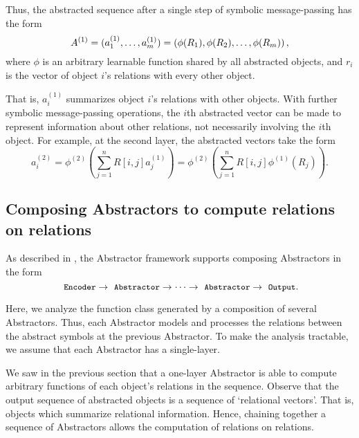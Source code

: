 Thus, the abstracted sequence after a single step of symbolic message-passing has the form
\begin{equation}
	\label{eq:abstracted_seq_1_layer_abstractor}
	A^{(1)} = (a_1^{(1)}, \ldots, a_m^{(1)}) = \left(\phi(R_1), \phi(R_2), \ldots, \phi(R_m)\right),
\end{equation}
where \(\phi\) is an arbitrary learnable function shared by all abstracted objects, and \(r_i\) is the vector of object \(i\)'s relations with every other object.

That is, \(a_i^{(1)}\) summarizes object \(i\)'s relations with other objects. With further symbolic message-passing operations, the \(i\)th abstracted vector can be made to represent information about other relations, not necessarily involving the \(i\)th object. For example, at the second layer, the abstracted vectors take the form
\begin{equation}
	a_i^{(2)} = \phi^{(2)} \left( \sum_{j=1}^{n} R[i,j] a_j^{(1)} \right) = \phi^{(2)} \left( \sum_{j=1}^{n} R[i,j] \phi^{(1)}(R_j) \right).
\end{equation}

\subsection{Composing  Abstractors to compute relations on relations}\label{ssec:compsing_abstractors}

As described in , the Abstractor framework supports composing  Abstractors in the form
\begin{equation*}
	\module{Encoder} \to \module{Abstractor} \to \cdots \to \module{Abstractor} \to \module{Output}.
\end{equation*}

Here, we analyze the function class generated by a composition of several Abstractors. Thus, each Abstractor models and processes the relations between the abstract symbols at the previous Abstractor. To make the analysis tractable, we assume that each Abstractor has a single-layer.

We saw in the previous section that a one-layer Abstractor is able to compute arbitrary functions of each object's relations in the sequence. Observe that the output sequence of abstracted objects is a sequence of `relational vectors'. That is, objects which summarize relational information. Hence, chaining together a sequence of  Abstractors allows the computation of relations on relations.

